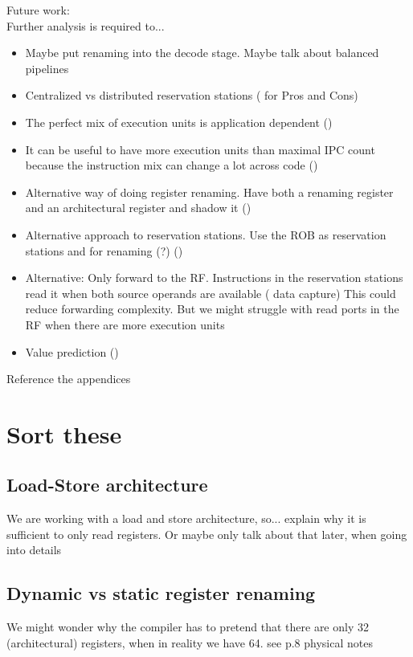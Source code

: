 \documentclass[12pt,a4paper]{article}
\newcommand{\note}{\textcolor{WildStrawberry}}
\begin{document}
Future work:\\
Further analysis is required to...
\begin{itemize}
	\item Maybe put renaming into the decode stage. Maybe talk about balanced pipelines
	\item Centralized vs distributed reservation stations (\cite[p.202]{lipastiShen} for Pros and Cons)
	\item The perfect mix of execution units is application dependent (\cite[p.205]{lipastiShen})
	\item It can be useful to have more execution units than maximal IPC count because the instruction mix can change a lot across code (\cite[p.206]{lipastiShen})
	\item Alternative way of doing register renaming. Have both a renaming register and an architectural register and shadow it (\cite[p.239]{lipastiShen})
	\item Alternative approach to reservation stations. Use the ROB as reservation stations and for renaming (?)  (\cite[p.259]{lipastiShen})
	\item Alternative: Only forward to the RF. Instructions in the reservation stations read it when both source operands are available  (\cite[p.260]{lipastiShen} data capture) This could reduce forwarding complexity. But we might struggle with read ports in the RF when there are more execution units
	\item Value prediction  (\cite[p.261]{lipastiShen})
\end{itemize}
\note{Reference the appendices}


\newpage
\section{Sort these}

\subsection{Load-Store architecture}
We are working with a load and store architecture, so... \note{explain why it is sufficient to only read registers. Or maybe only talk about that later, when going into details}

\subsection{Dynamic vs static register renaming}
We might wonder why the compiler has to pretend that there are only 32 (architectural) registers, when in reality we have 64. \note{see p.8 physical notes}
\end{document}
